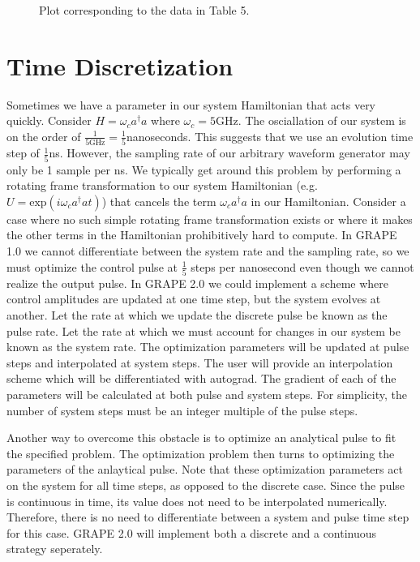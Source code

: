 \documentclass[letterpaper, 12pt]{article}
\begin{document}
\begin{figure}
  \caption{Plot corresponding to the data in Table 5.}
\end{figure}

\section{Time Discretization}
Sometimes we have a parameter in our system Hamiltonian that acts very quickly. Consider $H = \omega_{c}a^{\dagger}a$ where $\omega_{c} = 5$GHz. The osciallation of our system is on the order of $\frac{1}{5\textrm{GHz}} = \frac{1}{5}$nanoseconds. This suggests that we use an evolution time step of $\frac{1}{5}$ns. However, the sampling rate of our arbitrary waveform generator may only be 1 sample per ns. We typically get around this problem by performing a rotating frame transformation to our system Hamiltonian (e.g. $U=\textrm{exp}(i\omega_{c}a^{\dagger}at)$) that cancels the term $\omega_{c}a^{\dagger}a$ in our Hamiltonian. Consider a case where no such simple rotating frame transformation exists or where it makes the other terms in the Hamiltonian prohibitively hard to compute. In GRAPE 1.0 we cannot differentiate between the system rate and the sampling rate, so we must optimize the control pulse at $\frac{1}{5}$ steps per nanosecond even though we cannot realize the output pulse. In GRAPE 2.0 we could implement a scheme where control amplitudes are updated at one time step, but the system evolves at another. Let the rate at which we update the discrete pulse be known as the pulse rate. Let the rate at which we must account for changes in our system be known as the system rate. The optimization parameters will be updated at pulse steps and interpolated at system steps. The user will provide an interpolation scheme which will be differentiated with autograd. The gradient of each of the parameters will be calculated at both pulse and system steps. For simplicity, the number of system steps must be an integer multiple of the pulse steps.

Another way to overcome this obstacle is to optimize an analytical pulse to fit the specified problem. The optimization problem then turns to optimizing the parameters of the anlaytical pulse. Note that these optimization parameters act on the system for all time steps, as opposed to the discrete case. Since the pulse is continuous in time, its value does not need to be interpolated numerically. Therefore, there is no need to differentiate between a system and pulse time step for this case. GRAPE 2.0 will implement both a discrete and a continuous strategy seperately.
\end{document}
